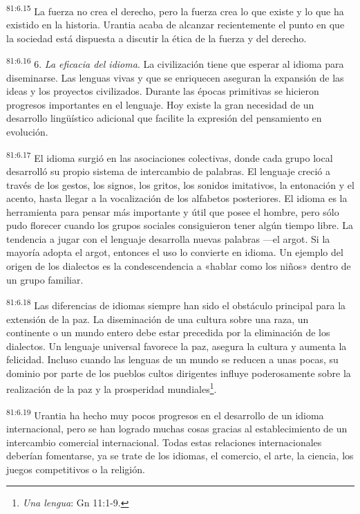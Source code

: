 \par
\textsuperscript{81:6.15} La fuerza no crea el derecho, pero la fuerza crea lo que existe y lo que ha existido en la historia. Urantia acaba de alcanzar recientemente el punto en que la sociedad está dispuesta a discutir la ética de la fuerza y del derecho.

\par
\textsuperscript{81:6.16} 6. \textit{La eficacia del idioma}. La civilización tiene que esperar al idioma para diseminarse. Las lenguas vivas y que se enriquecen aseguran la expansión de las ideas y los proyectos civilizados. Durante las épocas primitivas se hicieron progresos importantes en el lenguaje. Hoy existe la gran necesidad de un desarrollo ling\"uístico adicional que facilite la expresión del pensamiento en evolución.

\par
\textsuperscript{81:6.17} El idioma surgió en las asociaciones colectivas, donde cada grupo local desarrolló su propio sistema de intercambio de palabras. El lenguaje creció a través de los gestos, los signos, los gritos, los sonidos imitativos, la entonación y el acento, hasta llegar a la vocalización de los alfabetos posteriores. El idioma es la herramienta para pensar más importante y útil que posee el hombre, pero sólo pudo florecer cuando los grupos sociales consiguieron tener algún tiempo libre. La tendencia a jugar con el lenguaje desarrolla nuevas palabras ---el argot. Si la mayoría adopta el argot, entonces el uso lo convierte en idioma. Un ejemplo del origen de los dialectos es la condescendencia a «hablar como los niños» dentro de un grupo familiar.

\par
\textsuperscript{81:6.18} Las diferencias de idiomas siempre han sido el obstáculo principal para la extensión de la paz. La diseminación de una cultura sobre una raza, un continente o un mundo entero debe estar precedida por la eliminación de los dialectos. Un lenguaje universal favorece la paz, asegura la cultura y aumenta la felicidad. Incluso cuando las lenguas de un mundo se reducen a unas pocas, su dominio por parte de los pueblos cultos dirigentes influye poderosamente sobre la realización de la paz y la prosperidad mundiales\footnote{\textit{Una lengua}: Gn 11:1-9.}.

\par
\textsuperscript{81:6.19} Urantia ha hecho muy pocos progresos en el desarrollo de un idioma internacional, pero se han logrado muchas cosas gracias al establecimiento de un intercambio comercial internacional. Todas estas relaciones internacionales deberían fomentarse, ya se trate de los idiomas, el comercio, el arte, la ciencia, los juegos competitivos o la religión.

